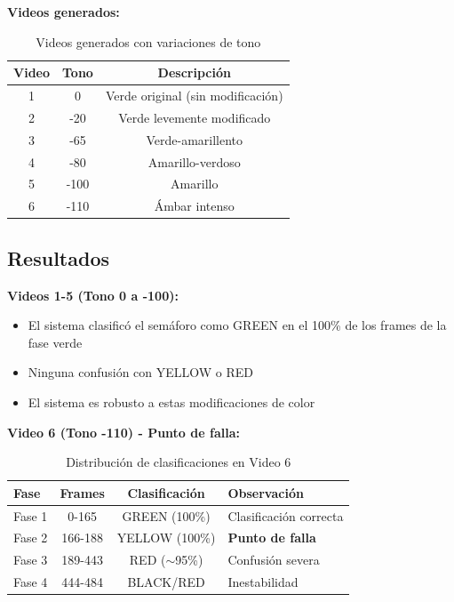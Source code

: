 \textbf{Videos generados:}

\begin{table}[H]
\centering
\begin{tabular}{|c|c|c|}
\hline
\textbf{Video} & \textbf{Tono} & \textbf{Descripción} \\
\hline
1 & 0 & Verde original (sin modificación) \\
2 & -20 & Verde levemente modificado \\
3 & -65 & Verde-amarillento \\
4 & -80 & Amarillo-verdoso \\
5 & -100 & Amarillo \\
6 & -110 & Ámbar intenso \\
\hline
\end{tabular}
\caption{Videos generados con variaciones de tono}
\end{table}

\subsection{Resultados}

\textbf{Videos 1-5 (Tono 0 a -100):}

\begin{itemize}
    \item El sistema clasificó el semáforo como GREEN en el 100\% de los frames de la fase verde
    \item Ninguna confusión con YELLOW o RED
    \item El sistema es robusto a estas modificaciones de color
\end{itemize}

\textbf{Video 6 (Tono -110) - Punto de falla:}

\begin{table}[H]
\centering
\begin{tabular}{|l|c|c|l|}
\hline
\textbf{Fase} & \textbf{Frames} & \textbf{Clasificación} & \textbf{Observación} \\
\hline
Fase 1 & 0-165 & GREEN (100\%) & Clasificación correcta \\
\hline
Fase 2 & 166-188 & YELLOW (100\%) & \textbf{Punto de falla} \\
\hline
Fase 3 & 189-443 & RED ($\sim$95\%) & Confusión severa \\
\hline
Fase 4 & 444-484 & BLACK/RED & Inestabilidad \\
\hline
\end{tabular}
\caption{Distribución de clasificaciones en Video 6}
\end{table}

